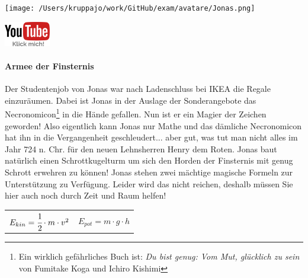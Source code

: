 \documentclass[a4paper, 9pt]{scrartcl}\usepackage[]{graphicx}\usepackage[]{xcolor}
\begin{document}
 
\ifcollection
\begin{flushright}
\tiny\vspace{-3Ex}
\textbf{\examinhaltstart}
\exammodulemathstat
\vspace{-4Ex}
\end{flushright}
\begin{minipage}[t]{0.5\textwidth}
\texttt{[image: /Users/kruppajo/work/GitHub/exam/avatare/Jonas.png]}
\end{minipage}
\begin{minipage}[t]{0.5\textwidth}
\hfill
\href{https://youtu.be/Bbu6n8MXxQk}{\includegraphics[width = 2cm]{img/youtube}}
\end{minipage}
\fi



\ifcollection
\paragraph{Armee der Finsternis}
\fi



Der Studentenjob von Jonas war nach Ladenschluss bei IKEA die Regale einzuräumen. Dabei ist Jonas in der Auslage der Sonderangebote das Necronomicon\footnote{Ein wirklich gefährliches Buch ist: \textit{Du bist genug: Vom Mut, glücklich zu sein} von Fumitake Koga und Ichiro Kishimi} in die Hände gefallen. Nun ist er ein Magier der Zeichen geworden! Also eigentlich kann Jonas nur Mathe und das dämliche Necronomicon hat ihn in die Vergangenheit geschleudert... aber gut, was tut man nicht alles im Jahr 724 n. Chr. für den neuen Lehnsherren Henry dem Roten. Jonas baut natürlich einen Schrottkugelturm um sich den
Horden der Finsternis mit genug Schrott erwehren zu können! Jonas stehen zwei mächtige magische Formeln zur Unterstützung zu Verfügung. Leider wird das nicht reichen, deshalb müssen Sie hier auch noch durch Zeit und Raum helfen!

\begin{center}
  \begin{tabular}{cc}
    $E_{kin} = \cfrac{1}{2}\cdot m \cdot v^2$ & $E_{pot} = m \cdot g \cdot h$\\
  \end{tabular}
\end{center}
\end{document}
